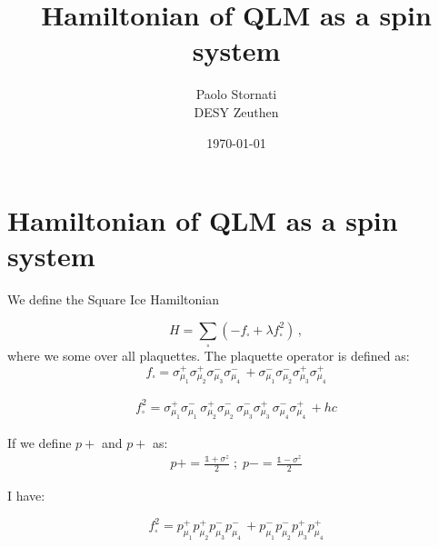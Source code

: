 \documentclass[12pt, a4paper, twoside, titlepage]{article}
\title{Hamiltonian of QLM as a spin system }
\author{Paolo Stornati \\
	DESY  Zeuthen \\
	}
\date{\today}
\begin{document}




\section{Hamiltonian of QLM as a spin system}

We define the Square Ice Hamiltonian

\begin{equation}
  \label{eq:Ham1}
    H = \sum_\square (-f_\square + \lambda f^2_\square)\,,\label{eq:hamiltonian}
\end{equation}
where we some over all plaquettes. The plaquette operator is defined as:
\begin{equation}\label{eq:plaquette}
       f_\square = \sigma^+_{\mu_1}\sigma^+_{\mu_2}\sigma^-_{\mu_3}\sigma^-_{\mu_4}\, +  \sigma^-_{\mu_1}\sigma^-_{\mu_2}\sigma^+_{\mu_3}\sigma^+_{\mu_4}
\end{equation}

\begin{align}
	f^2_\square= \sigma^+_{\mu_1} \sigma^-_{\mu_1} \, \sigma^+_{\mu_2} \sigma^-_{\mu_2} \, \sigma^-_{\mu_3} \sigma^+_{\mu_3} \, \sigma^-_{\mu_4} \sigma^+_{\mu_4}  \, + hc
\end{align}

If we define $p+$ and $p+$ as:
\begin{align}
	p+= \frac{ \mathbb{1} + \sigma^z }{2} \; ;	\; p-= \frac{ \mathbb{1} - \sigma^z }{2}
\end{align}

I have:

\begin{equation}\label{eq:plaquette}
	f^2_\square = p^+_{\mu_1}p^+_{\mu_2} p^-_{\mu_3} p^-_{\mu_4}\, +  p^-_{\mu_1} p^-_{\mu_2} p^+_{\mu_3} p^+_{\mu_4}
\end{equation}
\end{document}
